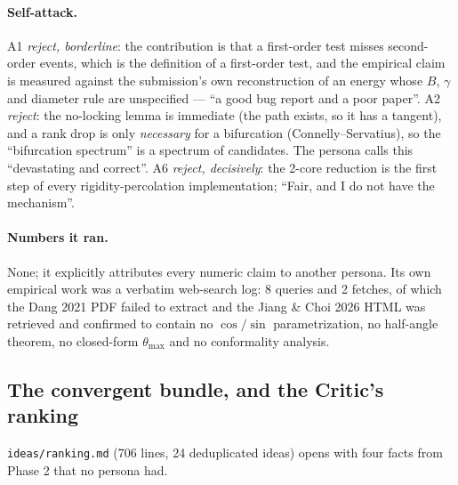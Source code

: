 \documentclass[10pt,a4paper]{article}
\newcommand{\fn}[1]{\nolinkurl{#1}}
\begin{document}
\paragraph{Self-attack.} A1 \emph{reject, borderline}: the contribution is that a first-order
test misses second-order events, which is the definition of a first-order test, and the
empirical claim is measured against the submission's own reconstruction of an energy whose
$B$, $\gamma$ and diameter rule are unspecified --- ``a good bug report and a poor paper''.
A2 \emph{reject}: the no-locking lemma is immediate (the path exists, so it has a tangent), and
a rank drop is only \emph{necessary} for a bifurcation (Connelly--Servatius), so the
``bifurcation spectrum'' is a spectrum of candidates. The persona calls this ``devastating and
correct''. A6 \emph{reject, decisively}: the 2-core reduction is the first step of every
rigidity-percolation implementation; ``Fair, and I do not have the mechanism''.

\paragraph{Numbers it ran.} None; it explicitly attributes every numeric claim to another
persona. Its own empirical work was a verbatim web-search log: 8 queries and 2 fetches, of
which the Dang 2021 PDF failed to extract and the Jiang \& Choi 2026 HTML was retrieved and
confirmed to contain no $\cos/\sin$ parametrization, no half-angle theorem, no closed-form
$\theta_{\max}$ and no conformality analysis.

\subsection{The convergent bundle, and the Critic's ranking}

\fn{ideas/ranking.md} (706 lines, 24 deduplicated ideas) opens with four facts from Phase 2
that no persona had.
\end{document}
